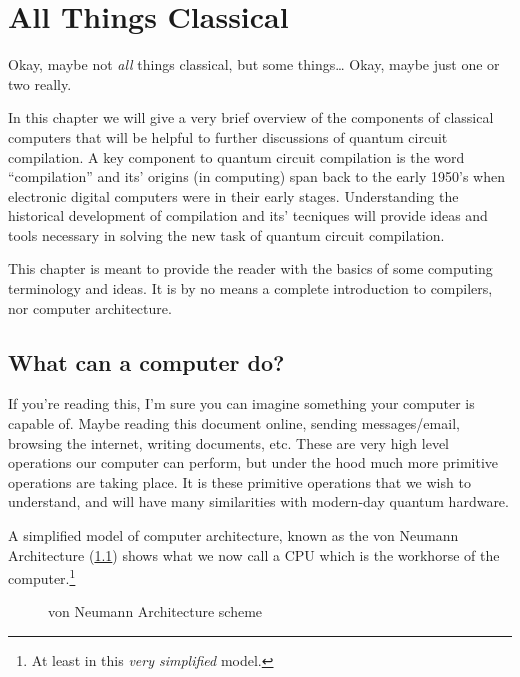 \chapter{All Things Classical}\label{chap:compilers}

Okay, maybe not \emph{all} things classical, but some things\dots
Okay, maybe just one or two really.

In this chapter we will give a very brief overview of the components of classical computers that will be helpful to further discussions of quantum circuit compilation.
A key component to quantum circuit compilation is the word ``compilation'' and its' origins (in computing) span back to the early 1950's when electronic digital computers were in their early stages.
Understanding the historical development of compilation and its' tecniques will provide ideas and tools necessary in solving the new task of quantum circuit compilation.

This chapter is meant to provide the reader with the basics of some computing terminology and ideas.
It is by no means a complete introduction to compilers, nor computer architecture.

\section{What can a computer do?}

If you're reading this, I'm sure you can imagine something your computer is capable of.
Maybe reading this document online, sending messages/email, browsing the internet, writing documents, etc.
These are very high level operations our computer can perform, but under the hood much more primitive operations are taking place.
It is these primitive operations that we wish to understand, and will have many similarities with modern-day quantum hardware.

A simplified model of computer architecture, known as the von Neumann Architecture (\cref{fig:comparch}) shows what we now call a \ac{CPU} which is the workhorse of the computer.\footnote{At least in this \emph{very simplified} model.}

\begin{figure}[h]
    \centering
    
    \caption{von Neumann Architecture scheme}\label{fig:comparch}
\end{figure}

